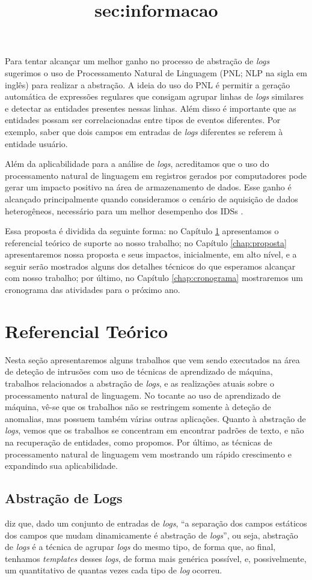 \documentclass[
	12pt,				%
	openright,			%
	twoside,			%
	a4paper,			%
	english,			%
	spanish,			%
	brazil,				%
	]{abntex2}
\begin{document}
Para tentar alcançar um melhor ganho no processo de abstração de \emph{logs} sugerimos o uso de Processamento Natural de Linguagem (PNL; NLP na sigla em inglês) para realizar a abstração. A ideia do uso do PNL é permitir a geração automática de expressões regulares que consigam agrupar linhas de \emph{logs} similares e detectar as entidades presentes nessas linhas. Além disso é importante que as entidades possam ser correlacionadas entre tipos de eventos diferentes. Por exemplo, saber que dois campos em entradas de \emph{logs} diferentes se referem à entidade usuário.

Além da aplicabilidade para a análise de \emph{logs}, acreditamos que o uso do processamento natural de linguagem em registros gerados por computadores pode gerar um impacto positivo na área de armazenamento de dados. Esse ganho é alcançado principalmente quando consideramos o cenário de aquisição de dados heterogêneos, necessário para um melhor desempenho dos IDSs \cite{zuech2015intrusion}.

Essa proposta é dividida da seguinte forma: no Capítulo \ref{chap:referencial} apresentamos o referencial teórico de suporte ao nosso trabalho; no Capítulo \ref{chap:proposta} apresentaremos nossa proposta e seus impactos, inicialmente, em alto nível, e a seguir serão mostrados alguns dos detalhes técnicos do que esperamos alcançar com nosso trabalho; por último, no Capítulo \ref{chap:cronograma} mostraremos um cronograma das atividades para o próximo ano.

\chapter{Referencial Teórico}\label{chap:referencial}

Nesta seção apresentaremos alguns trabalhos que vem sendo executados na área de deteção de intrusões com uso de técnicas de aprendizado de máquina, trabalhos relacionados a abstração de \emph{logs}, e as realizações atuais sobre o processamento natural de linguagem. No tocante ao uso de aprendizado de máquina, vê-se que os trabalhos não se restringem somente à deteção de anomalias, mas possuem também várias outras aplicações. Quanto à abstração de \emph{logs}, vemos que os trabalhos se concentram em encontrar padrões de texto, e não na recuperação de entidades, como propomos. Por último, as técnicas de processamento natural de linguagem vem mostrando um rápido crescimento e expandindo sua aplicabilidade.

\section{Abstração de Logs}\title{sec:informacao}
\cite{nagappan2010abstracting} diz que, dado um conjunto de entradas de \emph{logs}, ``a separação dos campos estáticos dos campos que mudam dinamicamente é abstração de \emph{logs}'', ou seja, abstração de \emph{logs} é a técnica de agrupar \emph{logs} do mesmo tipo, de forma que, ao final, tenhamos \emph{templates} desses \emph{logs}, de forma mais genérica possível, e, possivelmente, um quantitativo de quantas vezes cada tipo de \emph{log} ocorreu.
\end{document}
